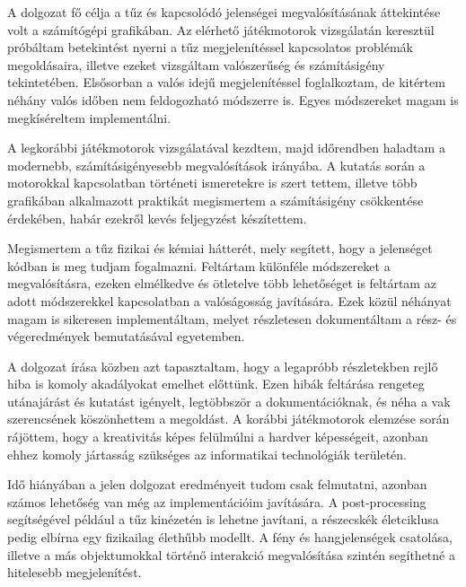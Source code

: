 
A dolgozat fő célja a tűz és kapcsolódó jelenségei megvalósításának áttekintése volt a számítógépi grafikában. Az elérhető játékmotorok vizsgálatán keresztül próbáltam betekintést nyerni a tűz megjelenítéssel kapcsolatos problémák megoldásaira, illetve ezeket vizsgáltam valószerűség és számításigény tekintetében. Elsősorban a valós idejű megjelenítéssel foglalkoztam, de kitértem néhány valós időben nem feldogozható módszerre is. Egyes módszereket magam is megkíséreltem implementálni.

A legkorábbi játékmotorok vizsgálatával kezdtem, majd időrendben haladtam a modernebb, számításigényesebb megvalósítások irányába. A kutatás során a motorokkal kapcsolatban történeti ismeretekre is szert tettem, illetve több grafikában alkalmazott praktikát megismertem a számításigény csökkentése érdekében, habár ezekről kevés feljegyzést készítettem. 

Megismertem a tűz fizikai és kémiai hátterét, mely segített, hogy a jelenséget kódban is meg tudjam fogalmazni. Feltártam különféle módszereket a megvalósításra, ezeken elmélkedve és ötletelve több lehetőséget is feltártam az adott módszerekkel kapcsolatban a valóságosság javítására. 
Ezek közül néhányat magam is sikeresen implementáltam, melyet részletesen dokumentáltam a rész- és végeredmények bemutatásával egyetemben. 

A dolgozat írása közben azt tapasztaltam, hogy a legapróbb részletekben rejlő hiba is komoly akadályokat emelhet előttünk. Ezen hibák feltárása rengeteg utánajárást és kutatást igényelt, legtöbbször a dokumentációknak, és néha a vak szerencsének köszönhettem a megoldást. A korábbi játékmotorok elemzése során rájöttem, hogy a kreativitás képes felülmúlni a hardver képességeit, azonban ehhez komoly jártasság szükséges az informatikai technológiák területén. 


Idő hiányában a jelen dolgozat eredményeit tudom csak felmutatni, azonban számos lehetőség van még az implementációim javítására. A post-processing segítségével például a tűz kinézetén is lehetne javítani, a részecskék életciklusa pedig elbírna egy fizikailag élethűbb modellt. A fény és hangjelenségek csatolása, illetve a más objektumokkal történő interakció megvalósítása szintén segíthetné a hitelesebb megjelenítést. 




